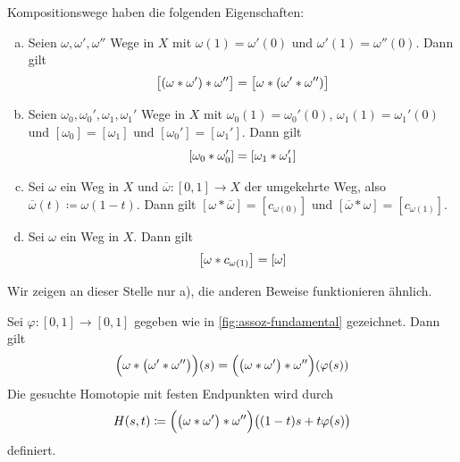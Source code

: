 \begin{lemma}[{name=[Eigenschaften von Kompositionswegen]},label=lem:eig-kompositionsweg]
	Kompositionswege haben die folgenden Eigenschaften:
	\begin{enumerate}[a)]
		\item Seien $\omega, \omega', \omega''$ Wege in $X$ mit $\omega(1)= \omega'(0)$ und $\omega'(1)= \omega''(0)$. Dann gilt 
		\[
			\benbrace[\big]{(\omega * \omega') * \omega''} =  \benbrace[\big]{\omega * ( \omega' * \omega'')}
		\]
		\item Seien $\omega_0, \omega_0', \omega_1, \omega_1'$ Wege in $X$ mit $\omega_0(1)= \omega_0'(0)$, $\omega_1(1)= \omega_1'(0)$ und 
		$[\omega_0] = [\omega_1]$ und $[\omega_0'] = [\omega_1']$. Dann gilt
		\[
			\benbrace*{\omega_0 * \omega_0'} = \benbrace*{\omega_1 * \omega_1'}
		\]
		\item Sei $\omega$ ein Weg in $X$ und $\overline{\omega} \colon [0,1] \to X $ der umgekehrte Weg, also $\overline{\omega} (t) \coloneqq \omega(1-t)$. 
		Dann gilt $[\omega * \overline{\omega}] = [c_{\omega(0)}]$ und $[\overline{\omega} * \omega ] = [c_{\omega(1)}]$.
		\item Sei $\omega$ ein Weg in $X$. Dann gilt 
		\[
			\benbrace*{\omega * c_{\omega(1)}} = [\omega]
		\]
	\end{enumerate}
\end{lemma}
\begin{beweis}
	Wir zeigen an dieser Stelle nur a), die anderen Beweise funktionieren ähnlich.
	
	\begin{figure}[bhtp]
	\end{figure}
	
	Sei $\varphi \colon [0,1] \to [0,1]$ gegeben wie in \cref{fig:assoz-fundamental} gezeichnet. 
	Dann gilt 
	\begin{align*}
		\enbrace[\Big]{\omega * \enbrace[\big]{\omega' * \omega''} }(s) = \enbrace[\Big]{\enbrace[\big]{\omega * \omega'} * \omega''} (\varphi(s))
	\end{align*}
	Die gesuchte Homotopie mit festen Endpunkten wird durch
	\[
		H(s,t) \coloneqq \enbrace[\Big]{ \enbrace[\big]{\omega * \omega'} * \omega'' } \enbrace[\big]{(1-t)s + t \varphi(s)}
	\]
	definiert.
\end{beweis}

